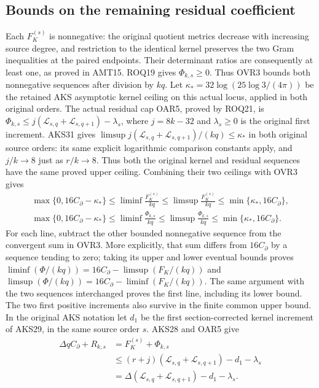 \documentclass[11pt,a4paper]{article}
\begin{document}
\subsection{Bounds on the remaining residual coefficient}
Each $F_K^{(s)}$ is nonnegative: the original quotient metrics decrease
with increasing source degree, and restriction to the identical kernel
preserves the two Gram inequalities at the paired endpoints. Their
determinant ratios are consequently at least one, as proved in AMT15.
ROQ19 gives $\Phi_{k,s}\ge0$. Thus OVR3 bounds both nonnegative
sequences after division by $kq$. Let
$\kappa_*=32\log(25\log3/(4\pi))$ be the retained AKS asymptotic
kernel ceiling on this actual locus, applied in both original orders.
The actual residual cap OAR5, proved by ROQ21, is
$\Phi_{k,s}\le j(\mathcal L_{s,q}+\mathcal L_{s,q+1})-\lambda_s$,
where $j=8k-32$ and $\lambda_s\ge0$ is the original first increment.
AKS31 gives
$\limsup j(\mathcal L_{s,q}+\mathcal L_{s,q+1})/(kq)\le\kappa_*$
in both original source orders: its same explicit logarithmic
comparison constants apply, and $j/k\to8$ just as $r/k\to8$.
Thus both the original kernel and residual sequences have the same
proved upper ceiling. Combining their two ceilings with OVR3 gives
\[
 \begin{gathered}
 \max\{0,16C_\partial-\kappa_*\}
       \le\liminf\frac{F_K^{(s)}}{kq}
       \le\limsup\frac{F_K^{(s)}}{kq}
       \le\min\{\kappa_*,16C_\partial\},\\
 \max\{0,16C_\partial-\kappa_*\}
       \le\liminf\frac{\Phi_{k,s}}{kq}
       \le\limsup\frac{\Phi_{k,s}}{kq}
       \le\min\{\kappa_*,16C_\partial\}.
 \end{gathered}\tag{OVR9}
\]
For each line, subtract the other bounded nonnegative sequence from
the convergent sum in OVR3. More explicitly, that sum differs from
$16C_\partial$ by a sequence tending to zero; taking its upper and
lower eventual bounds proves
$\liminf(\Phi/(kq))=16C_\partial-\limsup(F_K/(kq))$ and
$\limsup(\Phi/(kq))=16C_\partial-\liminf(F_K/(kq))$.
The same argument with the two sequences interchanged proves the
first line, including its lower bound. The two first positive
increments also survive in the finite common upper bound. In the
original AKS notation let $d_1$ be the first section-corrected kernel
increment of AKS29, in the same source order $s$. AKS28 and OAR5 give
\[
 \begin{split}
 \Delta q C_\partial+R_{k,s}
   &=F_K^{(s)}+\Phi_{k,s}\\
   &\le(r+j)(\mathcal L_{s,q}+\mathcal L_{s,q+1})-d_1-\lambda_s\\
   &=\Delta(\mathcal L_{s,q}+\mathcal L_{s,q+1})-d_1-\lambda_s.
 \end{split}\tag{OVR10}
\]
\end{document}
